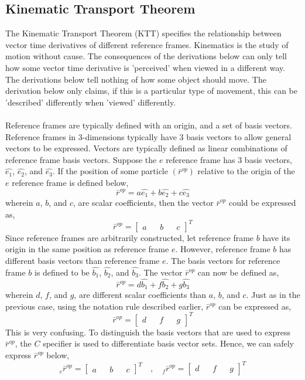 \documentclass[class=report, 12pt, crop=false]{standalone}
\begin{document}
\begin{center}

\chapter{Kinematic Transport Theorem}
\begin{comment}
\end{comment}
The Kinematic Transport Theorem (KTT) specifies the relationship between vector time derivatives of different reference frames. Kinematics is the study of motion without cause. The consequences of the derivations below can only tell how some vector time derivative is 'perceived' when viewed in a different way. The derivations below tell nothing of how some object should move. The derivation below only claims, if this is a particular type of movement, this can be 'described' differently when 'viewed' differently.
\\~\\Reference frames are typically defined with an origin, and a set of basis vectors. Reference frames in $3$-dimensions typically have $3$ basis vectors to allow general vectors to be expressed. Vectors are typically defined as linear combinations of reference frame basis vectors. Suppose the $e$ reference frame has $3$ basis vectors, $\hat{e_{1}}$, $\hat{e_{2}}$, and $\hat{e_{3}}$. If the position of some particle $\left(\bar{r}^{op}\right)$ relative to the origin of the $e$ reference frame is defined below,
$$\bar{r}^{op} = a\hat{e_{1}} + b\hat{e_{2}} + c\hat{e_{3}}$$
wherein $a$, $b$, and $c$, are scalar coefficients, then the vector $\bar{r}^{op}$ could be expressed as,
$$\bar{r}^{op} = \begin{bmatrix}
a && b && c
\end{bmatrix}^{T}$$
Since reference frames are arbitrarily constructed, let reference frame $b$ have its origin in the same position as reference frame $e$. However, reference frame $b$ has different basis vectors than reference frame $e$. The basis vectors for reference frame $b$ is defined to be $\hat{b_{1}}$, $\hat{b_{2}}$, and $\hat{b_{3}}$. The vector $\bar{r}^{op}$ can now be defined as,
$$\bar{r}^{op} = d\hat{b_{1}} + f\hat{b_{2}} + g\hat{b_{3}}$$
wherein $d$, $f$, and $g$, are different scalar coefficients than $a$, $b$, and $c$. Just as in the previous case, using the notation rule described earlier, $\bar{r}^{op}$ can be expressed as,
$$\bar{r}^{op} = \begin{bmatrix}
d && f && g
\end{bmatrix}^{T}$$
This is very confusing. To distinguish the basis vectors that are used to express $\bar{r}^{op}$, the $C$ specifier is used to differentiate basis vector sets. Hence, we can safely express $\bar{r}^{op}$ below,
$${}^{}_{e}\bar{r}^{op} = \begin{bmatrix}
a && b && c
\end{bmatrix}^{T} \quad,\quad {}^{}_{f}\bar{r}^{op} = \begin{bmatrix}
d && f && g
\end{bmatrix}^{T}$$

\end{center}
\end{document}
